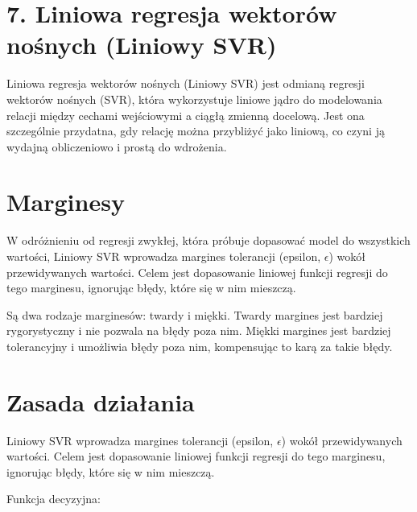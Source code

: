 {}
\justify
\fontsize{14}{16}\selectfont
\setlength{\parindent}{0pt}
\section*{7. Liniowa regresja wektorów nośnych (Liniowy SVR) \cite{alma991000280759708832}}
\fontsize{12}{14}\selectfont
\vspace{-1.0em}

\hspace{1.5cm} Liniowa regresja wektorów nośnych (Liniowy SVR) jest odmianą regresji wektorów nośnych (SVR), która wykorzystuje liniowe jądro do modelowania relacji między cechami wejściowymi a ciągłą zmienną docelową. Jest ona szczególnie przydatna, gdy relację można przybliżyć jako liniową, co czyni ją wydajną obliczeniowo i prostą do wdrożenia.

{}
\section*{Marginesy}
\vspace{-1.0em}

\hspace{1.5cm} W odróżnieniu od regresji zwykłej, która próbuje dopasować model do wszystkich wartości, Liniowy SVR wprowadza margines tolerancji (epsilon, $\epsilon$) wokół przewidywanych wartości. Celem jest dopasowanie liniowej funkcji regresji do tego marginesu, ignorując błędy, które się w nim mieszczą.

Są dwa rodzaje marginesów: twardy i miękki. 
Twardy margines jest bardziej rygorystyczny i nie pozwala na błędy poza nim. Miękki margines jest bardziej tolerancyjny i umożliwia błędy poza nim, kompensując to karą za takie błędy.

{}
\section*{Zasada działania}
\vspace{-1.0em}

\hspace{1.5cm} Liniowy SVR wprowadza margines tolerancji (epsilon, $\epsilon$) wokół przewidywanych wartości. Celem jest dopasowanie liniowej funkcji regresji do tego marginesu, ignorując błędy, które się w nim mieszczą.

Funkcja decyzyjna:


